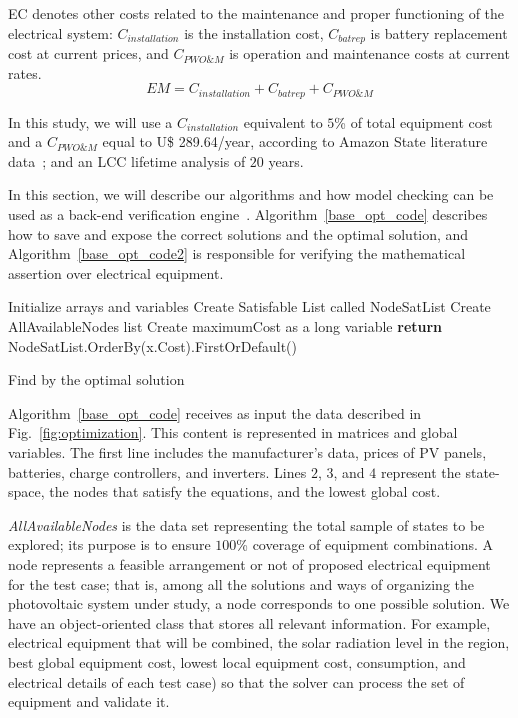 \documentclass[journal]{IEEEtran}
\begin{document}
EC denotes other costs related to the maintenance and proper functioning of the electrical system: $C_{installation}$ is the installation cost, $C_{batrep}$ is battery replacement cost at current prices, and $C_{PWO\&M}$ is operation and maintenance costs at current rates.
\begin{equation}
\label{eq:EquipamentMaintenence}
EM = C_{installation} + C_{batrep} + C_{PWO\&M}
\end{equation}

In this study, we will use a $C_{installation}$ equivalent to $5$\% of total equipment cost and a $C_{PWO\&M}$ equal to U\$ 289.64/year, according to Amazon State literature data~\cite{Agrener2013}; and an LCC lifetime analysis of $20$ years.

In this section, we will describe our algorithms and how model checking can be used as a back-end verification engine~\cite{DBLP:journals/corr/abs-1909-13139}. Algorithm~\ref{base_opt_code} describes how to save and expose the correct solutions and the optimal solution, and Algorithm~\ref{base_opt_code2} is responsible for verifying the mathematical assertion over electrical equipment.

\begin{algorithm}[ht]
\SetAlgoLined
{}
Initialize arrays and variables\;
Create Satisfable List called NodeSatList\;
Create AllAvailableNodes list\;
Create maximumCost as a long variable\;
\textbf{return} NodeSatList.OrderBy(x.Cost).FirstOrDefault()
\caption{Find by the optimal solution}
\label{base_opt_code}
\end{algorithm}

Algorithm~\ref{base_opt_code} receives as input the data described in Fig.~\ref{fig:optimization}. This content is represented in matrices and global variables. The first line includes the manufacturer's data, prices of PV panels, batteries, charge controllers, and inverters. Lines $2$, $3$, and $4$ represent the state-space, the nodes that satisfy the equations, and the lowest global cost.

\textit{AllAvailableNodes} is the data set representing the total sample of states to be explored; its purpose is to ensure $100$\% coverage of equipment combinations. A node represents a feasible arrangement or not of proposed electrical equipment for the test case; that is, among all the solutions and ways of organizing the photovoltaic system under study, a node corresponds to one possible solution. We have an object-oriented class that stores all relevant information. For example, electrical equipment that will be combined, the solar radiation level in the region, best global equipment cost, lowest local equipment cost, consumption, and electrical details of each test case) so that the solver can process the set of equipment and validate it.
\end{document}
